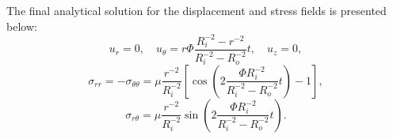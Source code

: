 \documentclass[12pt]{article}
\begin{document}
The final analytical solution for the displacement and stress fields is presented below:
\begin{equation}
  u_r = 0, \quad u_\theta = r \Phi \frac{R_i^{-2} - r^{-2}}{R_i^{-2} - R_o^{-2}} t, \quad u_z = 0,
\end{equation}
\begin{equation}
  \sigma_{rr} = - \sigma_{\theta \theta} = \mu \frac{r^{-2}}{R_i^{-2}} \left[ \cos \left( 2 \frac{\Phi R_i^{-2}}{R_i^{-2} - R_o^{-2}} t \right) - 1 \right],
\end{equation}
\begin{equation}
  \sigma_{r \theta} = \mu \frac{r^{-2}}{R_i^{-2}} \sin \left( 2 \frac{\Phi R_i^{-2}}{R_i^{-2} - R_o^{-2}} t \right).
\end{equation}
\end{document}
